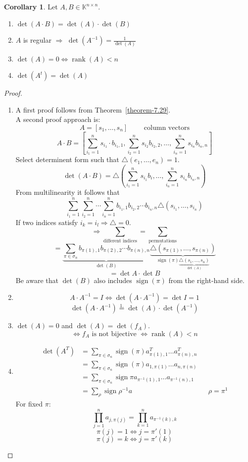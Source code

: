 \documentclass[a4paper,landscape,twocolumn]{article}
\theoremstyle{definition}
\newtheorem{cor}{Corollary}
\DeclareMathOperator\rank{rank} %
\DeclareMathOperator\sign{sign}
\begin{document}
\begin{cor}
  \label{cor-7.30}
  Let $A,B \in \mathbb K^{n\times n}$.
  \begin{enumerate}
    \item $\det(A \cdot B) = \det(A) \cdot \det(B)$
    \item $A$ is regular $\Rightarrow$ $\det(A^{-1}) = \frac{1}{\det(A)}$
    \item $\det(A) = 0 \Leftrightarrow \rank(A) < n$
    \item $\det(A^t) = \det(A)$
  \end{enumerate}
\end{cor}
\begin{proof}
  \begin{enumerate}
    \item A first proof follows from Theorem~\ref{theorem-7.29}. \\
      A second proof approach is:
      \[ A = [s_1, \ldots, s_n] \qquad \text{ column vectors} \]
      \[ A \cdot B = \left[\sum_{i_1=1}^n s_{i_1} \cdot b_{i_1,1}, \sum_{i_2=1}^n s_{i_2} b_{i_2,2}, \ldots, \sum_{i_n=1}^n s_{i_n} b_{i_n,n}\right] \]
      Select determinent form such that $\triangle(e_1, \ldots, e_n) = 1$.
      \[ \det(A \cdot B) = \triangle\left(\sum_{i_1=1}^n s_{i_1} b_{i}, \ldots, \sum_{i_n=1}^n s_{i_n} b_{i_n,n}\right) \]
      From multilinearity it follows that
      \[ \sum_{i_1=1}^n \sum_{i_2=1}^n \cdots \sum_{i_n=1}^n b_{i_1,1} b_{i_2,2} \cdots b_{i_n,n} \triangle (s_{i_1}, \ldots, s_{i_n}) \]
      If two indices satisfy $i_k = i_l \Rightarrow \triangle = 0$.
      \[ \Rightarrow \sum_{\text{different indices}} = \sum_{\text{permutations}} \]
      \[ = \underbrace{\sum_{\pi \in \sigma_n} b_{\pi(1),1} b_{\pi(2),2} \cdots b_{\pi(n),n}}_{\det(B)} \underbrace{\triangle(s_{\pi(1)}, \ldots, s_{\pi(n)})}_{\sign(\pi) \underbrace{\triangle(s_1, \ldots, s_n)}_{\det(A)}} \]
      \[ = \det{A} \cdot \det{B} \]
      Be aware that $\det(B)$ also includes $\sign(\pi)$ from the right-hand side.
    \item
      \[ A \cdot A^{-1} = I \Leftrightarrow \det(A \cdot A^{-1}) = \det{I} = 1 \]
      \[ \det(A \cdot A^{-1}) \overset{\text{1.}}= \det(A) \cdot \det(A^{-1}) \]
    \item
      $\det(A) = 0$ and $\det(A) = \det(f_A)$.
      \[ \Leftrightarrow f_A \text{ is not bijective } \Leftrightarrow \rank(A) < n \]
    \item
      \begin{align*}
        \det(A^T)
          &= \sum_{\pi \in \sigma_n} \sign(\pi) a^T_{\pi(1),1} \ldots a^T_{\pi(n),n} \\
          &= \sum_{\pi \in \sigma_n} \sign(\pi) a_{1,\pi(1)} \ldots a_{n,\pi(n)} \\
          &= \sum_{\pi \in \sigma_n} \sign{\pi} a_{\pi^{-1}(1),1} \ldots a_{\pi^{-1}(n),1} \\
          &= \sum_{\rho} \sign{\rho^{-1}} a
          & & \rho = \pi^{1}
      \end{align*}
      For fixed $\pi$:
      \[ \prod_{j=1}^n a_{j,\pi(j)} = \prod_{k=1}^n a_{\pi^{-1}(k),k} \]
      \[ \pi(j) = 1 \Leftrightarrow j = \pi'(1) \]
      \[ \pi(j) = k \Leftrightarrow j = \pi'(k) \]


\end{enumerate}
\end{proof}
\end{document}
